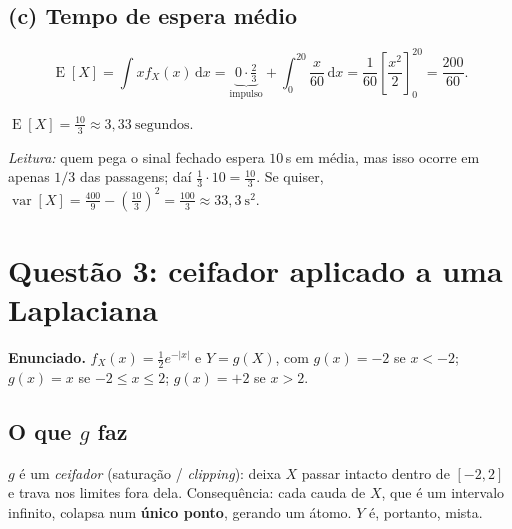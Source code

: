 \documentclass[11pt,a4paper]{article}
\newcommand{\dd}{\,\mathrm{d}}
\DeclareMathOperator{\E}{E}
\DeclareMathOperator{\var}{var}
\begin{document}
\subsection*{(c) Tempo de espera médio}

\[
\E[X]=\int x f_X(x)\dd x
= \underbrace{0\cdot\tfrac23}_{\text{impulso}}
+ \int_0^{20}\frac{x}{60}\dd x
= \frac1{60}\left[\frac{x^2}{2}\right]_0^{20}
= \frac{200}{60}.
\]

\begin{resp}
$\displaystyle \E[X]=\frac{10}{3}\approx 3{,}33\ \text{segundos}.$
\end{resp}

\emph{Leitura:} quem pega o sinal fechado espera $10$\,s em média, mas isso ocorre
em apenas $1/3$ das passagens; daí $\tfrac13\cdot10=\tfrac{10}3$.
Se quiser, $\var[X]=\tfrac{400}{9}-\left(\tfrac{10}{3}\right)^2=\tfrac{100}{3}\approx33{,}3\ \mathrm{s^2}$.

\clearpage
\section{Questão 3: ceifador aplicado a uma Laplaciana}

\textbf{Enunciado.} $f_X(x)=\tfrac12 e^{-|x|}$ e $Y=g(X)$, com
$g(x)=-2$ se $x<-2$; $g(x)=x$ se $-2\le x\le2$; $g(x)=+2$ se $x>2$.

\subsection*{O que $g$ faz}

$g$ é um \emph{ceifador} (saturação / \emph{clipping}): deixa $X$ passar intacto
dentro de $[-2,2]$ e trava nos limites fora dela. Consequência: cada cauda de $X$,
que é um intervalo infinito, colapsa num \textbf{único ponto}, gerando um átomo.
$Y$ é, portanto, mista.

\begin{center}
\end{center}
\end{document}
